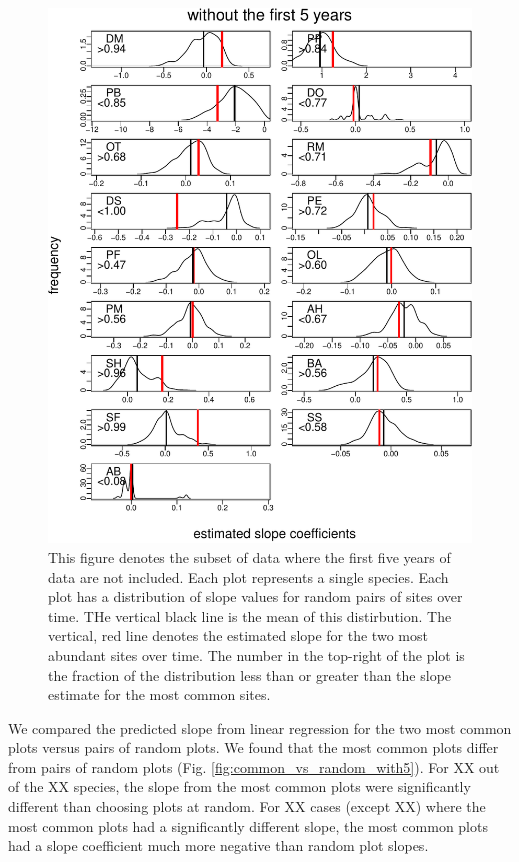 \documentclass[]{article}
\begin{document}
\begin{figure}
\centering
\includegraphics{Empirical_Investigation_files/figure-latex/unnamed-chunk-3-1.pdf}
\caption{This figure denotes the subset of data where the first five
years of data are not included. Each plot represents a single species.
Each plot has a distribution of slope values for random pairs of sites
over time. THe vertical black line is the mean of this distirbution. The
vertical, red line denotes the estimated slope for the two most abundant
sites over time. The number in the top-right of the plot is the fraction
of the distribution less than or greater than the slope estimate for the
most common sites.\label{fig:common_vs_random_without5}}
\end{figure}

We compared the predicted slope from linear regression for the two most
common plots versus pairs of random plots. We found that the most common
plots differ from pairs of random plots (Fig.
\ref{fig:common_vs_random_with5}). For XX out of the XX species, the
slope from the most common plots were significantly different than
choosing plots at random. For XX cases (except XX) where the most common
plots had a significantly different slope, the most common plots had a
slope coefficient much more negative than random plot slopes.
\end{document}
